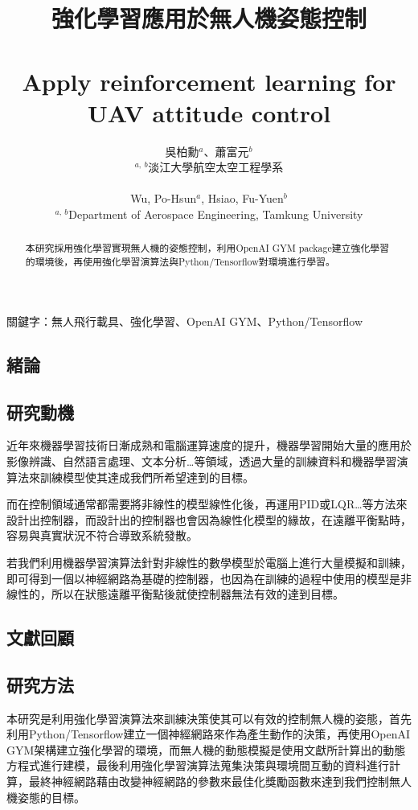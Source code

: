 \documentclass[a4paper, onecolumn, 11pt, AutoFakeBold]{article}
\title{\textfourteen
    \textbf{強化學習應用於無人機姿態控制}\\
    \ \\
    \textbf{Apply reinforcement learning for UAV attitude control}
}
\author{\texttwelve
    吳柏勳$^{a}$、蕭富元$^{b}$\\
    $^{a,\ b}$淡江大學航空太空工程學系\\
    \ \\
    Wu, Po-Hsun$^{a}$, Hsiao, Fu-Yuen$^{b}$\\
    $^{a,\ b}$Department of Aerospace Engineering, Tamkung University
}
\date{}
\newcommand{\textpt}[1]{\fontsize{#1}{#1}\selectfont}
\begin{document}
\maketitle
\thispagestyle{fancy}

\begin{abstract} \textpt{11}
本研究採用強化學習實現無人機的姿態控制，利用OpenAI GYM package建立強化學習的環境後，再使用強化學習演算法與Python/Tensorflow對環境進行學習。
\end{abstract}
\smallskip

關鍵字：無人飛行載具、強化學習、OpenAI GYM、Python/Tensorflow
\smallskip

\begin{multicols*}{2}

\section{緒論}
\subsection{研究動機}
\par
近年來機器學習技術日漸成熟和電腦運算速度的提升，機器學習開始大量的應用於影像辨識、自然語言處理、文本分析…等領域，透過大量的訓練資料和機器學習演算法來訓練模型使其達成我們所希望達到的目標。
\par
而在控制領域通常都需要將非線性的模型線性化後，再運用PID或LQR…等方法來設計出控制器，而設計出的控制器也會因為線性化模型的緣故，在遠離平衡點時，容易與真實狀況不符合導致系統發散。
\par
若我們利用機器學習演算法針對非線性的數學模型於電腦上進行大量模擬和訓練，即可得到一個以神經網路為基礎的控制器，也因為在訓練的過程中使用的模型是非線性的，所以在狀態遠離平衡點後就使控制器無法有效的達到目標。

\smallskip
\subsection{文獻回顧}
\cite{Flight_Controller_Synthesis_Via_Deep_Reinforcement_Learning}
\cite{Reinforcement_Learning_for_UAV_Attitude_Control}
\cite{Optimal_Sliding_Mode_Controller_for_Fixed-wing_UAV}

\blindtext

\smallskip
\subsection{研究方法}
\par
本研究是利用強化學習演算法來訓練決策使其可以有效的控制無人機的姿態，首先利用Python/Tensorflow建立一個神經網路來作為產生動作的決策，再使用OpenAI GYM架構建立強化學習的環境，而無人機的動態模擬是使用文獻\cite{Optimal_Sliding_Mode_Controller_for_Fixed-wing_UAV}所計算出的動態方程式進行建模，最後利用強化學習演算法蒐集決策與環境間互動的資料進行計算，最終神經網路藉由改變神經網路的參數來最佳化獎勵函數來達到我們控制無人機姿態的目標。


\end{multicols*}
\end{document}

